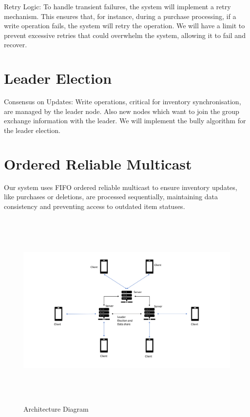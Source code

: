 Retry Logic: To handle transient failures, the system will implement a retry mechanism. This ensures that, for instance, during a purchase processing, if a write operation fails, the system will retry the operation. We will have a limit to  prevent excessive retries that could overwhelm the system, allowing it to fail and recover.

\section{Leader Election} \label{sec:Election}
Consensus on Updates: Write operations, critical for inventory synchronisation, are managed by the leader node. Also new nodes which want to join the group exchange information with the leader. We will implement the bully algorithm for the leader election. 

\section{Ordered Reliable Multicast} \label{sec:OrderedReliableMulticast}
Our system uses FIFO ordered reliable multicast to ensure inventory updates, like purchases or deletions, are processed sequentially, maintaining data consistency and preventing access to outdated item statuses.

\begin{figure}[h!]
        \includegraphics[height=10cm, width=18cm]{images/Architecture.png}
        \caption{Architecture Diagram}
        \label{fig:architecture}
\end{figure}
